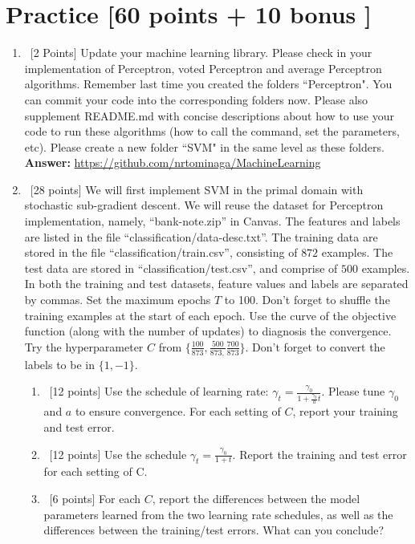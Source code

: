 \documentclass[12pt, fullpage,letterpaper]{article}
\newcommand{\Answer}{{\\\textbf{Answer: }}}
\begin{document}
\section{Practice [60 points + 10 bonus ]}
\begin{enumerate}
	\item~[2 Points] Update your machine learning library. Please check in your implementation of Perceptron, voted Perceptron and average Perceptron algorithms. Remember last time you created the folders ``Perceptron". You can commit your code into the corresponding folders now. Please also supplement README.md with concise descriptions about how to use your code to run these algorithms (how to call the command, set the parameters, etc). Please create a new folder ``SVM" in the same level as these folders.  
	\Answer \url{https://github.com/nrtominaga/MachineLearning}
	\item~[28 points] We will first implement SVM in the primal domain with stochastic sub-gradient descent. We will reuse the  dataset for Perceptron implementation, namely, ``bank-note.zip'' in Canvas. The features and labels are listed in the file ``classification/data-desc.txt''. The training data are stored in the file ``classification/train.csv'', consisting of $872$ examples. The test data are stored in ``classification/test.csv'', and comprise of $500$ examples. In both the training and test datasets, feature values and labels are separated by commas. Set the maximum epochs $T$ to 100. Don't forget to shuffle the training examples at the start of each epoch. Use the curve of the objective function (along with the number of updates) to diagnosis the convergence. Try the hyperparameter $C$ from $\{ \frac{100}{873}, \frac{500}{873,} \frac{700}{873}\}$. Don't forget to convert the labels to be in $\{1, -1\}$.  
	\begin{enumerate}
		\item~[12 points] Use the schedule of learning rate: $\gamma_t = \frac{\gamma_0}{1+\frac{\gamma_0}{a}t}	$. Please tune $\gamma_0$ and $a$ to ensure convergence. For each setting of $C$, report your training and test error. 
		\item~[12 points] Use the schedule $\gamma_t = \frac{\gamma_0}{1+t}$. Report the training and test error for each setting of C. 
		\item~[6 points] For each $C$, report the differences between the model parameters learned from the two learning rate schedules, as well as the differences between the training/test errors. What can you conclude? 
	\end{enumerate}



\end{enumerate}
\end{document}
